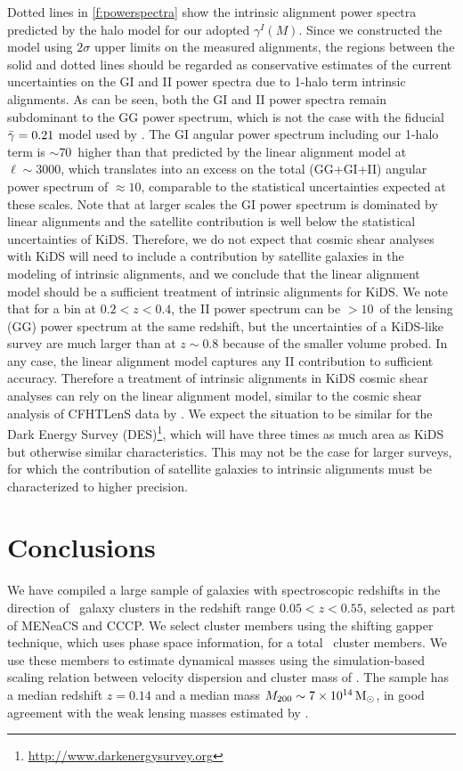 Dotted lines in \cref{f:powerspectra} show the intrinsic alignment power spectra predicted by the 
halo model for our adopted $\gamma^I(M)$. Since we constructed the model using $2\sigma$ upper 
limits on the measured alignments, the regions between the solid and dotted lines should be regarded 
as conservative estimates of the current uncertainties on the GI and II power spectra due to 1-halo 
term intrinsic alignments. As can be seen, both the GI and II power spectra remain subdominant to 
the GG power spectrum, which is not the case with the fiducial $\bar{\gamma}=0.21$ model used by 
\cite{schneider10}. The GI angular power spectrum including our 1-halo term is $\sim$70\percent\ higher 
than that predicted by the linear alignment model at $\ell\sim3000$, which translates into an excess 
on the total (GG+GI+II) angular power spectrum of $\approx10$\percent, comparable to the statistical 
uncertainties expected at these scales. Note that at larger scales the GI power spectrum is 
dominated by linear alignments and the satellite contribution is well below the statistical 
uncertainties of KiDS. Therefore, we do not expect that cosmic shear analyses with KiDS will need to 
include a contribution by satellite galaxies in the modeling of intrinsic alignments, and we 
conclude that the linear alignment model should be a sufficient treatment of intrinsic 
alignments for KiDS. We note that for a bin at $0.2<z<0.4$, the II power spectrum can be $>10$\percent\ of 
the lensing (GG) power spectrum at the same redshift, but the uncertainties of a KiDS-like survey 
are much larger than at $z\sim0.8$ because of the smaller volume probed. In any case, the linear 
alignment model captures any II contribution to sufficient accuracy. Therefore a treatment of 
intrinsic alignments in KiDS cosmic shear analyses can rely on the linear alignment model, similar 
to the cosmic shear analysis of CFHTLenS data by \cite{heymans13}. We expect the situation to be 
similar for the Dark Energy Survey (DES)\footnote{\url{http://www.darkenergysurvey.org}}, which 
will have three times as much area as KiDS but otherwise similar characteristics. This may not be 
the case for larger surveys, for which the contribution of satellite galaxies to intrinsic 
alignments must be characterized to higher precision.


\section{Conclusions}

We have compiled a large sample of galaxies with spectroscopic redshifts in the direction of \Ncl\ 
galaxy clusters in the redshift range $0.05<z<0.55$, selected as part of MENeaCS and CCCP. We 
select cluster members using the shifting gapper technique, which uses phase space information, for 
a total \Nmembers\ cluster members. We use these members to estimate dynamical masses using the 
simulation-based scaling relation between velocity dispersion and cluster mass of \cite{evrard08}. 
The sample has a median redshift $z=0.14$ and a median mass $M_{200}\sim7\times10^{14}\,{\rm M}_\odot$, 
in good agreement with the weak lensing masses estimated by \cite{hoekstra12}.

